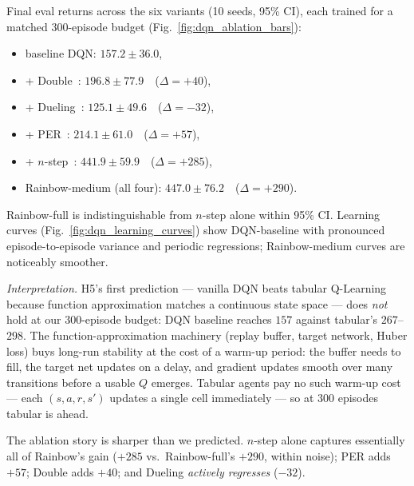\documentclass[conference]{IEEEtran}
\begin{document}
Final eval returns across the six variants (10 seeds, 95\% CI), each
trained for a matched 300-episode budget
(Fig.~\ref{fig:dqn_ablation_bars}):
\begin{itemize}
\itemsep0em
\item baseline DQN: $157.2 \pm 36.0$,
\item + Double~\cite{vanhasselt2016}: $196.8 \pm 77.9$~~($\Delta = +40$),
\item + Dueling~\cite{wang2016}: $125.1 \pm 49.6$~~($\Delta = -32$),
\item + PER~\cite{schaul2016}: $214.1 \pm 61.0$~~($\Delta = +57$),
\item + $n$-step~\cite{sutton1988}: $441.9 \pm 59.9$~~($\Delta = +285$),
\item Rainbow-medium (all four): $447.0 \pm 76.2$~~($\Delta = +290$).
\end{itemize}
Rainbow-full is indistinguishable from $n$-step alone within 95\% CI.
Learning curves (Fig.~\ref{fig:dqn_learning_curves}) show DQN-baseline
with pronounced episode-to-episode variance and periodic regressions;
Rainbow-medium curves are noticeably smoother.

\emph{Interpretation.} H5's first prediction --- vanilla DQN beats
tabular Q-Learning because function approximation matches a continuous
state space --- does \emph{not} hold at our 300-episode budget: DQN
baseline reaches $157$ against tabular's $267$--$298$. The
function-approximation machinery (replay buffer, target network, Huber
loss) buys long-run stability at the cost of a warm-up period: the
buffer needs to fill, the target net updates on a delay, and gradient
updates smooth over many transitions before a usable $Q$ emerges.
Tabular agents pay no such warm-up cost --- each $(s, a, r, s')$
updates a single cell immediately --- so at $300$ episodes tabular is
ahead.

The ablation story is sharper than we predicted. $n$-step alone
captures essentially all of Rainbow's gain ($+285$ vs.\
Rainbow-full's $+290$, within noise); PER adds $+57$; Double adds
$+40$; and Dueling \emph{actively regresses} ($-32$).
\end{document}
